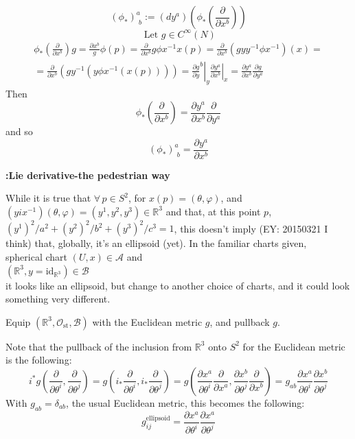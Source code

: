 	\questionhead{}
	
	\[
	(\phi_*)^a_{ \, \, b} := (dy^a)(\phi_*( \frac{ \partial }{ \partial x^b } ) )
	\]
	\[
	\text{ Let } g \in C^{\infty}(N)
	\]
	\[
	\begin{gathered}
	\phi_* \left( \frac{ \partial }{ \partial x^b} \right) g = \frac{ \partial x^b} g\phi(p) = \frac{ \partial }{ \partial x^b} g\phi x^{-1}x(p) = \frac{ \partial }{ \partial x^b}(gyy^{-1}\phi x^{-1})(x) = \\
	= \frac{ \partial }{ \partial x^b}(gy^{-1}(y\phi x^{-1}(x(p))) ) = \left. \frac{ \partial g}{ \partial y}^b \right|_y \left. \frac{ \partial y^a}{ \partial x^b} \right|_x = \frac{ \partial y^a}{ \partial x^b} \frac{ \partial g}{ \partial y^a}
	\end{gathered}
	\]
	Then 
	\[
	\phi_*\left( \frac{ \partial }{ \partial x^b} \right) = \frac{ \partial y^a}{ \partial x^b} \frac{ \partial }{ \partial y^a}
	\]
	and so 
	\[
	(\phi_*)^a_{ \, \, b} = \frac{ \partial y^a}{ \partial x^b}
	\]
	
	\questionhead{}
	
	\textbf{:Lie derivative-the pedestrian way}
	
	\questionhead{} While it is true that $\forall \, p \in S^2$, for $x(p) = (\theta, \varphi)$, and $(yix^{-1})(\theta,\varphi) = (y^1,y^2,y^3) \in \mathbb{R}^3$ and that, at this point $p$, $(y^1)^2/a^2 + (y^2)^2/b^2 +(y^3)^2/c^3 = 1$, this doesn't imply (EY: 20150321 I think) that, globally, it's an ellipsoid (yet).  In the familiar charts given, \\
	spherical chart $(U,x) \in \mathcal{A}$ and \\
	$(\mathbb{R}^3, y=\text{id}_{\mathbb{R}^3}) \in \mathcal{B}$ \\
	it looks like an ellipsoid, but change to another choice of charts, and it could look something very different.  
	
	\questionhead{}
	
	Equip $(\mathbb{R}^3, \mathcal{O}_{\text{st}}, \mathcal{B})$ with the Euclidean metric $g$, and pullback $g$.  
	
	Note that the pullback of the inclusion from $\mathbb{R}^3$ onto $S^2$ for the Euclidean metric is the following:
	\[
	i^* g\left( \frac{ \partial }{ \partial \theta^i }, \frac{ \partial }{ \partial \theta^j} \right) = g\left( i_*\frac{ \partial }{ \partial \theta^i }, i_*\frac{ \partial }{ \partial \theta^j} \right) = g\left( \frac{ \partial x^a}{ \partial \theta^i} \frac{ \partial }{ \partial x^a} , \frac{ \partial x^b}{ \partial \theta^j} \frac{ \partial }{ \partial x^b } \right) = g_{ab} \frac{ \partial x^a}{ \partial \theta^i} \frac{ \partial x^b}{ \partial \theta^j} 
	\]
	With $g_{ab}=\delta_{ab}$, the usual Euclidean metric, this becomes the following:
	\[
	g^{\text{ellipsoid}}_{ij} = \frac{ \partial x^a}{ \partial \theta^i} \frac{ \partial x^a}{ \partial \theta^j} 
	\]
	
